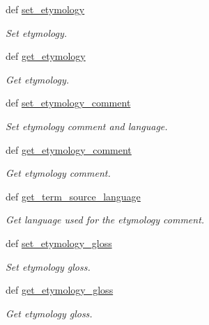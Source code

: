 \begin{DoxyCompactItemize}
def \hyperlink{classlmf_1_1src_1_1core_1_1lexical__entry_1_1_lexical_entry_a90650c9ec70a484186405f9b40efa618}{set\+\_\+etymology}
\begin{DoxyCompactList}\small\item\em Set etymology. \end{DoxyCompactList}\item 
def \hyperlink{classlmf_1_1src_1_1core_1_1lexical__entry_1_1_lexical_entry_ab2168094e851c2dccb798fc2a0e45ec2}{get\+\_\+etymology}
\begin{DoxyCompactList}\small\item\em Get etymology. \end{DoxyCompactList}\item 
def \hyperlink{classlmf_1_1src_1_1core_1_1lexical__entry_1_1_lexical_entry_ac585a9ac515b028d919fd4902bcf5c1b}{set\+\_\+etymology\+\_\+comment}
\begin{DoxyCompactList}\small\item\em Set etymology comment and language. \end{DoxyCompactList}\item 
def \hyperlink{classlmf_1_1src_1_1core_1_1lexical__entry_1_1_lexical_entry_a667de841ccf2e947f15ed1b3fbd3fe77}{get\+\_\+etymology\+\_\+comment}
\begin{DoxyCompactList}\small\item\em Get etymology comment. \end{DoxyCompactList}\item 
def \hyperlink{classlmf_1_1src_1_1core_1_1lexical__entry_1_1_lexical_entry_a5588b93f3b5fc77c3ea74fd7fef1cca1}{get\+\_\+term\+\_\+source\+\_\+language}
\begin{DoxyCompactList}\small\item\em Get language used for the etymology comment. \end{DoxyCompactList}\item 
def \hyperlink{classlmf_1_1src_1_1core_1_1lexical__entry_1_1_lexical_entry_a9e37ea6e11cfdd10b7fe48f332d5dbe9}{set\+\_\+etymology\+\_\+gloss}
\begin{DoxyCompactList}\small\item\em Set etymology gloss. \end{DoxyCompactList}\item 
def \hyperlink{classlmf_1_1src_1_1core_1_1lexical__entry_1_1_lexical_entry_a1756da5cb9ce0bab99cc900d3204be27}{get\+\_\+etymology\+\_\+gloss}
\begin{DoxyCompactList}\small\item\em Get etymology gloss. \end{DoxyCompactList}\item 

\end{DoxyCompactItemize}

